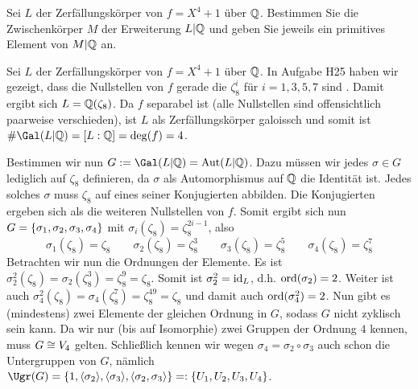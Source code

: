 \begin{exercisePage}
	
	\setcounter{taskcount}{85}
	
	\begin{homework}
		Sei $L$ der Zerfällungskörper von $f = X^4 + 1$ über $\mathbb{Q}$. Bestimmen Sie die Zwischenkörper $M$ der Erweiterung $L|\mathbb{Q}$ und geben Sie jeweils ein primitives Element von $M | \mathbb{Q}$ an.

	\end{homework}

	Sei $L$ der Zerfällungskörper von $f = X^4 + 1$ über $\mathbb{Q}$. In Aufgabe H25 haben wir gezeigt, dass die Nullstellen von $f$ gerade die $\zeta_8^i$ für $i = 1,3,5,7$ sind . Damit ergibt sich $L = \mathbb{Q}(\zeta_8)$. Da $f$ separabel ist (alle Nullstellen sind offensichtlich paarweise verschieden), ist $L$ als Zerfällungskörper galoissch und somit ist $\# \Gal(L | \Q) = [L : \Q] = \deg(f) = 4$. 
	
	Bestimmen wir nun $G \defeq \Gal(L | \Q) = \Aut(L | \Q)$. Dazu müssen wir jedes $\sigma \in G$ lediglich auf $\zeta_8$ definieren, da $\sigma$ als Automorphismus auf $\mathbb{Q}$ die Identität ist. Jedes solches $\sigma$ muss $\zeta_8$ auf eines seiner Konjugierten abbilden. Die Konjugierten ergeben sich als die weiteren Nullstellen von $f$. Somit ergibt sich nun $G = \left\{ \sigma_1, \sigma_2, \sigma_3, \sigma_4 \right\}$ mit $\sigma_i(\zeta_8) = \zeta_8^{2i-1}$, also
	\begin{equation*}
		\sigma_1(\zeta_8) = \zeta_8 \qquad \sigma_2(\zeta_8) = \zeta_8^3 \qquad \sigma_3(\zeta_8) = \zeta_8^5 \qquad \sigma_4(\zeta_8) = \zeta_8^7
	\end{equation*}
	Betrachten wir nun die Ordnungen der Elemente. Es ist $\sigma_2^2(\zeta_8) = \sigma_2(\zeta_8^3) = \zeta_8^9 = \zeta_8$. Somit ist $\sigma_2^2  = \operatorname{id}_L$, d.h. $\operatorname{ord}(\sigma_2) = 2$. Weiter ist auch $\sigma_4^2(\zeta_8) = \sigma_4(\zeta_8^7) = \zeta_8^{49} = \zeta_8$ und damit auch $\operatorname{ord}(\sigma_4^2) = 2$. Nun gibt es (mindestens) zwei Elemente der gleichen Ordnung in $G$, sodass $G$ nicht zyklisch sein kann. Da wir nur (bis auf Isomorphie) zwei Gruppen der Ordnung $4$ kennen, muss $G \mathrel{\cong} V_4$ gelten. Schließlich kennen wir wegen $\sigma_4 = \sigma_2 \circ \sigma_3$ auch schon die Untergruppen von $G$, nämlich $\Ugr(G) = \menge{1, \erz{\sigma_2} , \erz{\sigma_3} , \erz{\sigma_2, \sigma_3}} \defqe \menge{U_1, U_2, U_3, U_4}$. 
	

\end{exercisePage}
